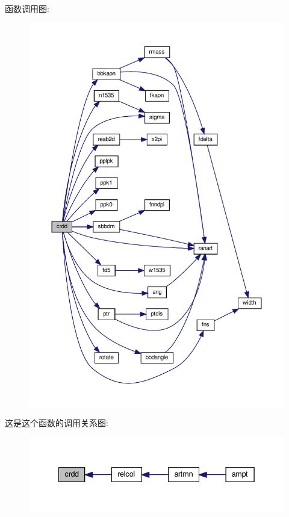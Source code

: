 函数调用图\+:
\nopagebreak
\begin{figure}[H]
\begin{center}
\leavevmode
\includegraphics[width=350pt]{crdd_8f90_a5f08f298066534487989cbf4a179e7fe_cgraph}
\end{center}
\end{figure}
这是这个函数的调用关系图\+:
\nopagebreak
\begin{figure}[H]
\begin{center}
\leavevmode
\includegraphics[width=342pt]{crdd_8f90_a5f08f298066534487989cbf4a179e7fe_icgraph}
\end{center}
\end{figure}
